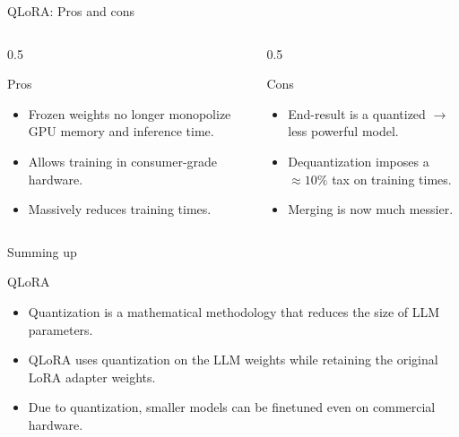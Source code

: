 \documentclass[24pt]{beamer}
\begin{document}
\begin{frame}{QLoRA: Pros and cons}
    \begin{columns}
        \begin{column}{0.5\columnwidth}
            \begin{exampleblock}{Pros}
                \begin{itemize}
                    \item Frozen weights no longer monopolize
                    \alert{GPU memory} and inference \alert{time}. \item
                    Allows training in \alert{consumer-grade} hardware.
                    \item Massively \alert{reduces training} times.
                \end{itemize}
            \end{exampleblock}
        \end{column}
        \begin{column}{0.5\columnwidth}
            \begin{alertblock}{Cons}
                \begin{itemize}
                    \item End-result is a quantized $\rightarrow$
                    \alert{
                        less
                        powerful
                    }
                    model. \item Dequantization imposes a $\approx 10\%$ tax
                    on training times. \item Merging is now much messier.
                \end{itemize}
            \end{alertblock}
        \end{column}
    \end{columns}
\end{frame}

\begin{frame}{Summing up}
	\begin{block}{QLoRA}
		\begin{itemize}
			\item Quantization is a mathematical methodology that reduces the size of LLM parameters.
			\item QLoRA uses quantization on the LLM weights while retaining the original LoRA adapter weights.
			\item Due to quantization, smaller models can be finetuned even on commercial hardware.
		\end{itemize}
	\end{block}
\end{frame}
\end{document}
